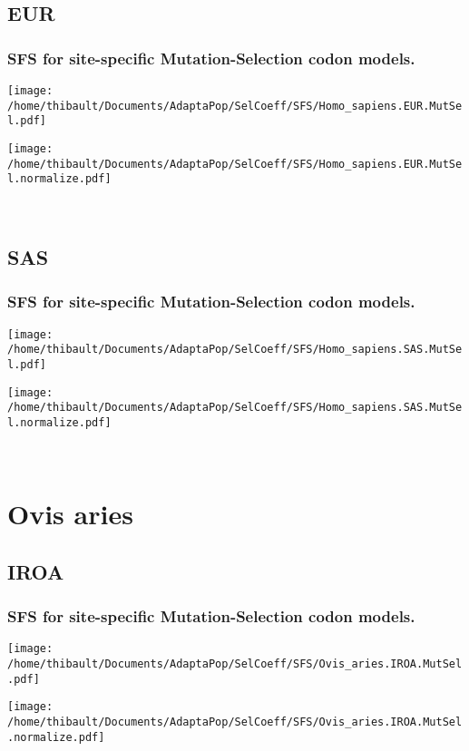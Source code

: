 \subsection{EUR} 
 
\subsubsection*{SFS for site-specific Mutation-Selection codon models.} 
\begin{minipage}{0.49\linewidth} 
\texttt{[image: /home/thibault/Documents/AdaptaPop/SelCoeff/SFS/Homo\_sapiens.EUR.MutSel.pdf]} 
\end{minipage}
\begin{minipage}{0.49\linewidth}
\texttt{[image: /home/thibault/Documents/AdaptaPop/SelCoeff/SFS/Homo\_sapiens.EUR.MutSel.normalize.pdf]} 
\end{minipage}
\\ 
\subsection{SAS} 
 
\subsubsection*{SFS for site-specific Mutation-Selection codon models.} 
\begin{minipage}{0.49\linewidth} 
\texttt{[image: /home/thibault/Documents/AdaptaPop/SelCoeff/SFS/Homo\_sapiens.SAS.MutSel.pdf]} 
\end{minipage}
\begin{minipage}{0.49\linewidth}
\texttt{[image: /home/thibault/Documents/AdaptaPop/SelCoeff/SFS/Homo\_sapiens.SAS.MutSel.normalize.pdf]} 
\end{minipage}
\\ 
\section{Ovis aries} 
 
\subsection{IROA} 
 
\subsubsection*{SFS for site-specific Mutation-Selection codon models.} 
\begin{minipage}{0.49\linewidth} 
\texttt{[image: /home/thibault/Documents/AdaptaPop/SelCoeff/SFS/Ovis\_aries.IROA.MutSel.pdf]} 
\end{minipage}
\begin{minipage}{0.49\linewidth}
\texttt{[image: /home/thibault/Documents/AdaptaPop/SelCoeff/SFS/Ovis\_aries.IROA.MutSel.normalize.pdf]} 
\end{minipage}
\\ 
